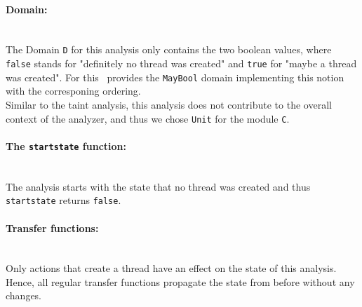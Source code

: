     \paragraph{Domain:}\mbox{}\\
    The Domain \texttt{D} for this analysis only contains the two boolean values, where \texttt{false} stands for "definitely no thread was created" and \texttt{true} for "maybe a thread was created". For this \gob\ provides the \texttt{MayBool} domain implementing this notion with the corresponing ordering.\\
    Similar to the taint analysis, this analysis does not contribute to the overall context of the analyzer, and thus we chose \texttt{Unit} for the module \texttt{C}.

    \paragraph{The \texttt{startstate} function:}\mbox{}\\
    The analysis starts with the state that no thread was created and thus \texttt{startstate} returns \texttt{false}.

    \paragraph{Transfer functions:}\mbox{}\\
    Only actions that create a thread have an effect on the state of this analysis. Hence, all regular transfer functions propagate the state from before without any changes.

